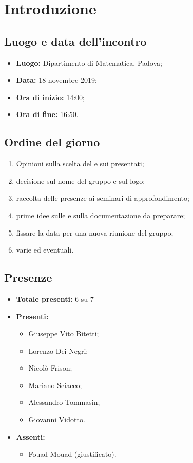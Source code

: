 \section*{Introduzione}

\subsection*{Luogo e data dell'incontro}
	\begin{itemize}
		\item \textbf{Luogo:} Dipartimento di Matematica, Padova;
		\item \textbf{Data:} 18 novembre 2019;
		\item \textbf{Ora di inizio:} 14:00;
		\item \textbf{Ora di fine:} 16:50.
	\end{itemize}

\subsection*{Ordine del giorno}
	\begin{enumerate}
		\item Opinioni sulla scelta del  e sui  presentati;
		\item decisione sul nome del gruppo e sul logo;
		\item raccolta delle presenze ai seminari di approfondimento;
		\item prime idee sulle  e sulla documentazione da preparare;
		\item fissare la data per una nuova riunione del gruppo;
		\item varie ed eventuali.
	\end{enumerate}

\subsection*{Presenze}
	\begin{itemize}
		\item \textbf{Totale presenti:} 6 su 7
		\item \textbf{Presenti: }
			\begin{itemize}
				\item Giuseppe Vito Bitetti;
				\item Lorenzo Dei Negri;
				\item Nicolò Frison;
				\item Mariano Sciacco;
				\item Alessandro Tommasin;
				\item Giovanni Vidotto.
			\end{itemize}
		\item \textbf{Assenti: }
			\begin{itemize}
				\item Fouad Mouad (giustificato).
			\end{itemize}
	\end{itemize}


